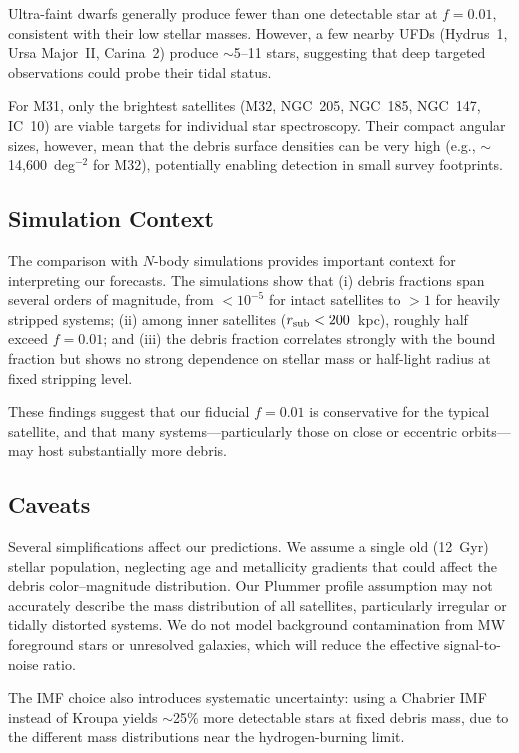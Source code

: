 \documentclass[twocolumn]{aastex63}
\begin{document}
Ultra-faint dwarfs generally produce fewer than one detectable star at $f = 0.01$, consistent with their low stellar masses. However, a few nearby UFDs (Hydrus~1, Ursa Major~II, Carina~2) produce $\sim$5--11 stars, suggesting that deep targeted observations could probe their tidal status.

For M31, only the brightest satellites (M32, NGC~205, NGC~185, NGC~147, IC~10) are viable targets for individual star spectroscopy. Their compact angular sizes, however, mean that the debris surface densities can be very high (e.g., $\sim$14,600~deg$^{-2}$ for M32), potentially enabling detection in small survey footprints.

\subsection{Simulation Context}

The comparison with $N$-body simulations provides important context for interpreting our forecasts. The simulations show that (i) debris fractions span several orders of magnitude, from $< 10^{-5}$ for intact satellites to $> 1$ for heavily stripped systems; (ii) among inner satellites ($r_{\rm sub} < 200$~kpc), roughly half exceed $f = 0.01$; and (iii) the debris fraction correlates strongly with the bound fraction but shows no strong dependence on stellar mass or half-light radius at fixed stripping level.

These findings suggest that our fiducial $f = 0.01$ is conservative for the typical satellite, and that many systems---particularly those on close or eccentric orbits---may host substantially more debris.

\subsection{Caveats}

Several simplifications affect our predictions. We assume a single old (12~Gyr) stellar population, neglecting age and metallicity gradients that could affect the debris color--magnitude distribution. Our Plummer profile assumption may not accurately describe the mass distribution of all satellites, particularly irregular or tidally distorted systems. We do not model background contamination from MW foreground stars or unresolved galaxies, which will reduce the effective signal-to-noise ratio.

The IMF choice also introduces systematic uncertainty: using a Chabrier IMF instead of Kroupa yields $\sim$25\% more detectable stars at fixed debris mass, due to the different mass distributions near the hydrogen-burning limit.
\end{document}
